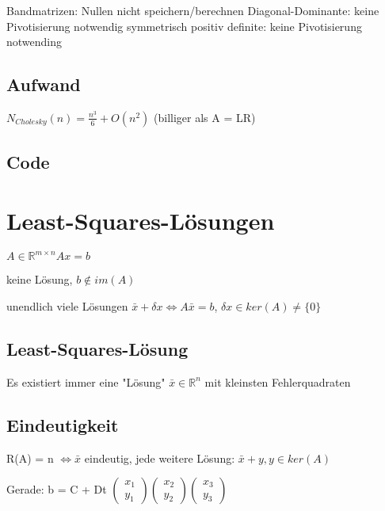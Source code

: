 \documentclass[12pt,a4paper]{article} %
\newcommand*\tab[1][1cm]{\hspace*{#1}}
\begin{document}
	Bandmatrizen: Nullen nicht speichern/berechnen Diagonal-Dominante: keine Pivotisierung notwendig symmetrisch positiv definite: keine Pivotisierung notwending
	
	\subsection{Aufwand}
	
	$N_{Cholesky}(n) = \frac{n^3}{6} + O(n^2)$ \tab (billiger als A = LR)
	
	\subsection{Code}
	
	\newpage
	
	\section{Least-Squares-Lösungen}
	
	$A \in \mathbb{R}^{m \times n} Ax = b$
	
	keine Lösung, $b \notin im(A)$
	
	unendlich viele Lösungen $\bar{x} + \delta x \Leftrightarrow A\bar{x}= b$, $\delta x \in ker(A) \ne \{0\}$
	
	\subsection{Least-Squares-Lösung}
	
	Es existiert immer eine "Lösung" $\bar{x} \in \mathbb{R}^n$ mit kleinsten Fehlerquadraten
	
	\subsection{Eindeutigkeit}
	
	R(A) = n $\Leftrightarrow \bar{x}$ eindeutig, jede weitere Lösung: $\bar{x} + y, y \in ker(A)$
	
	Gerade: b = C + Dt 
	$\begin{pmatrix}
		x_1 \\
		y_1
	\end{pmatrix}
	\begin{pmatrix}
	x_2 \\
	y_2
	\end{pmatrix}
	\begin{pmatrix}
	x_3 \\
	y_3
	\end{pmatrix}$
	
\end{document}
